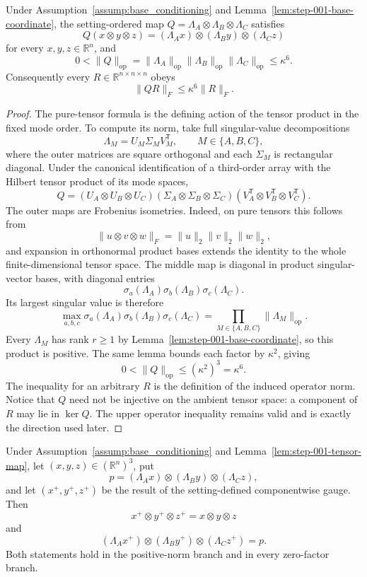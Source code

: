 \begin{lemma}
\label{lem:step-001-tensor-map}
Under Assumption~\ref{assump:base_conditioning} and
Lemma~\ref{lem:step-001-base-coordinate}, the setting-ordered map
$Q=\Lambda_A\otimes\Lambda_B\otimes\Lambda_C$ satisfies
\[
Q(x\otimes y\otimes z)
=(\Lambda_Ax)\otimes(\Lambda_By)\otimes(\Lambda_Cz)
\]
for every $x,y,z\in\mathbb R^n$, and
\[
0<\|Q\|_{\mathrm{op}}
=\|\Lambda_A\|_{\mathrm{op}}
 \|\Lambda_B\|_{\mathrm{op}}
 \|\Lambda_C\|_{\mathrm{op}}
\leq\kappa^6.
\]
Consequently every $R\in\mathbb R^{n\times n\times n}$ obeys
\[
\|QR\|_F\leq\kappa^6\|R\|_F.
\]
\end{lemma}

\begin{proof}
The pure-tensor formula is the defining action of the tensor product in the
fixed mode order.  To compute its norm, take full singular-value
decompositions
\[
\Lambda_M=U_M\Sigma_MV_M^{\mathsf T},
\qquad M\in\{A,B,C\},
\]
where the outer matrices are square orthogonal and each $\Sigma_M$ is
rectangular diagonal.  Under the canonical identification of a third-order
array with the Hilbert tensor product of its mode spaces,
\[
Q=(U_A\otimes U_B\otimes U_C)
  (\Sigma_A\otimes\Sigma_B\otimes\Sigma_C)
  (V_A^{\mathsf T}\otimes V_B^{\mathsf T}\otimes V_C^{\mathsf T}).
\]
The outer maps are Frobenius isometries.  Indeed, on pure tensors this follows
from
\[
\|u\otimes v\otimes w\|_F=\|u\|_2\|v\|_2\|w\|_2,
\]
and expansion in orthonormal product bases extends the identity to the whole
finite-dimensional tensor space.  The middle map is diagonal in product
singular-vector bases, with diagonal entries
\[
\sigma_a(\Lambda_A)\sigma_b(\Lambda_B)\sigma_c(\Lambda_C).
\]
Its largest singular value is therefore
\[
\max_{a,b,c}
\sigma_a(\Lambda_A)\sigma_b(\Lambda_B)\sigma_c(\Lambda_C)
=\prod_{M\in\{A,B,C\}}\|\Lambda_M\|_{\mathrm{op}}.
\]
Every $\Lambda_M$ has rank $r\geq1$ by
Lemma~\ref{lem:step-001-base-coordinate}, so this product is positive.
The same lemma bounds each factor by $\kappa^2$, giving
\[
0<\|Q\|_{\mathrm{op}}\leq(\kappa^2)^3=\kappa^6.
\]
The inequality for an arbitrary $R$ is the definition of the induced
operator norm.  Notice that $Q$ need not be injective on the ambient tensor
space: a component of $R$ may lie in $\ker Q$.  The upper operator inequality
remains valid and is exactly the direction used later.
\end{proof}

\begin{lemma}
\label{lem:step-001-gauge}
Under Assumption~\ref{assump:base_conditioning} and
Lemma~\ref{lem:step-001-tensor-map}, let $(x,y,z)\in(\mathbb R^n)^3$, put
\[
p=(\Lambda_Ax)\otimes(\Lambda_By)\otimes(\Lambda_Cz),
\]
and let $(x^+,y^+,z^+)$ be the result of the setting-defined componentwise
gauge.  Then
\[
x^+\otimes y^+\otimes z^+=x\otimes y\otimes z
\]
and
\[
(\Lambda_Ax^+)\otimes(\Lambda_By^+)\otimes(\Lambda_Cz^+)=p.
\]
Both statements hold in the positive-norm branch and in every zero-factor
branch.
\end{lemma}

